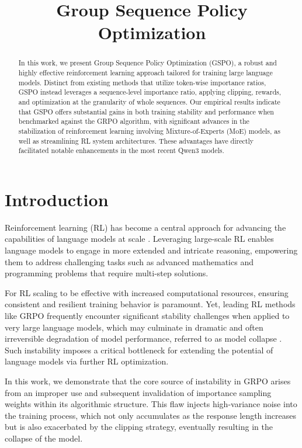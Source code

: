 \title{Group Sequence Policy Optimization}

\begin{abstract}
In this work, we present Group Sequence Policy Optimization (GSPO), a robust and highly effective reinforcement learning approach tailored for training large language models. Distinct from existing methods that utilize token-wise importance ratios, GSPO instead leverages a sequence-level importance ratio, applying clipping, rewards, and optimization at the granularity of whole sequences. Our empirical results indicate that GSPO offers substantial gains in both training stability and performance when benchmarked against the GRPO algorithm, with significant advances in the stabilization of reinforcement learning involving Mixture-of-Experts (MoE) models, as well as streamlining RL system architectures. These advantages have directly facilitated notable enhancements in the most recent Qwen3 models.
\end{abstract}

\section{Introduction}
\label{sec:intro}

Reinforcement learning (RL) has become a central approach for advancing the capabilities of language models at scale \citep{o1,dpsk-r1,qwq32b,qwen3}. Leveraging large-scale RL enables language models to engage in more extended and intricate reasoning, empowering them to address challenging tasks such as advanced mathematics and programming problems that require multi-step solutions.

For RL scaling to be effective with increased computational resources, ensuring consistent and resilient training behavior is paramount. Yet, leading RL methods like GRPO \citep{grpo} frequently encounter significant stability challenges when applied to very large language models, which may culminate in dramatic and often irreversible degradation of model performance, referred to as model collapse \citep{qwen3, minimax-m1}. Such instability imposes a critical bottleneck for extending the potential of language models via further RL optimization.

In this work, we demonstrate that the core source of instability in GRPO arises from an improper use and subsequent invalidation of importance sampling weights within its algorithmic structure. This flaw injects high-variance noise into the training process, which not only accumulates as the response length increases but is also exacerbated by the clipping strategy, eventually resulting in the collapse of the model.

